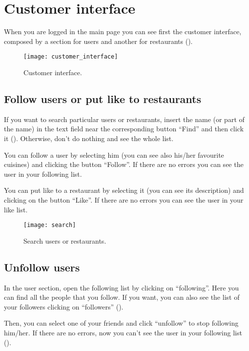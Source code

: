 \section{Customer interface}

When you are logged in the main page you can see first the customer interface,
composed by a section for users and another for restaurants
().

\begin{figure}[H]
	\texttt{[image: customer\_interface]}
	\caption{Customer interface.}\label{fig:customer_interface}
\end{figure}

\subsection{Follow users or put like to restaurants}

If you want to search particular users or restaurants, insert the name (or part
of the name) in the text field near the corresponding button ``Find'' and then
click it (). Otherwise, don't do nothing and see the whole
list.

You can follow a user by selecting him (you can see also his/her favourite
cuisines) and clicking the button ``Follow''. If there are no errors you can see
the user in your following list.

You can put like to a restaurant by selecting it (you can see its description)
and clicking on the button ``Like''. If there are no errors you can see the user
in your like list.

\begin{figure}[H]
	\texttt{[image: search]}
	\caption{Search users or restaurants.}\label{fig:search}
\end{figure}

\subsection{Unfollow users}

In the user section, open the following list by clicking on ``following''. Here
you can find all the people that you follow. If you want, you can also see the
list of your followers clicking on ``followers'' ().

Then, you can select one of your friends and click ``unfollow'' to stop
following him/her. If there are no errors, now you can't see the user in your
following list ().

